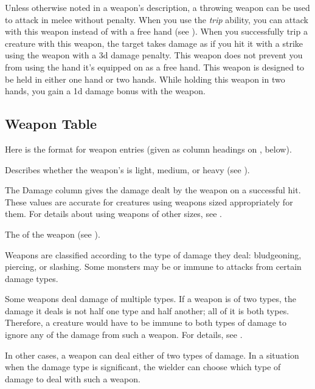             Unless otherwise noted in a weapon's description, a throwing weapon can be used to attack in melee without penalty.
             When you use the \textit{trip} ability, you can attack with this weapon instead of with a free hand (see ).
            When you successfully trip a creature with this weapon, the target takes damage as if you hit it with a strike using the weapon with a \minus3d damage penalty.
             This weapon does not prevent you from using the hand it's equipped on as a free hand.
             This weapon is designed to be held in either one hand or two hands.
            While holding this weapon in two hands, you gain a \plus1d damage bonus with the weapon.

    \subsection{Weapon Table}
        Here is the format for weapon entries (given as column headings on , below).

         Describes whether the weapon's  is light, medium, or heavy (see ).

         The Damage column gives the damage dealt by the weapon on a successful hit.
        These values are accurate for creatures using weapons sized appropriately for them.
        For details about using weapons of other sizes, see .

         The  of the weapon (see ).

         Weapons are classified according to the type of damage they deal: bludgeoning, piercing, or slashing.
        Some monsters may be  or immune to attacks from certain damage types.

        Some weapons deal damage of multiple types. If a weapon is of two types, the damage it deals is not half one type and half another; all of it is both types.
        Therefore, a creature would have to be immune to both types of damage to ignore any of the damage from such a weapon.
        For details, see .

        In other cases, a weapon can deal either of two types of damage. In a situation when the damage type is significant, the wielder can choose which type of damage to deal with such a weapon.

